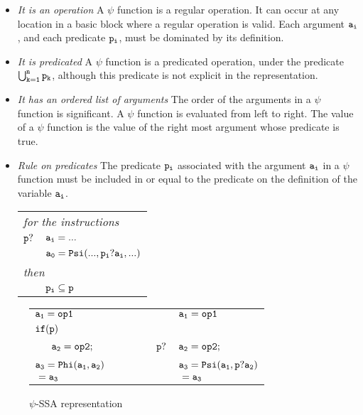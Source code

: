 \begin{itemize}

\item{\emph{It is an operation}} A $\psi$ function is a regular operation. It
  can occur at any location in a basic block where a regular operation
  is valid. Each argument ${\tt a_i}$, and each predicate ${\tt p_i}$,
  must be dominated by its definition.

\item{\emph{It is predicated}} A $\psi$ function is a predicated
  operation, under the predicate ${\tt \bigcup_{k=1}^n p_k}$,
  although this predicate is not explicit in the representation.

\item{\emph{It has an ordered list of arguments}} The order of the
  arguments in a $\psi$ function is significant. A $\psi$ function is
  evaluated from left to right. The value of a $\psi$ function is the
  value of the right most argument whose predicate is true.

\item{\emph{Rule on predicates}} The predicate ${\tt p_i}$ associated
  with the argument ${\tt a_i}$ in a $\psi$ function must be included
  in or equal to the predicate on the definition of the variable ${\tt
    a_i}$.

\begin{tabular}{ll}
\multicolumn{2}{l}{\it for the instructions}\\
${\tt p?}$ & ${\tt a_i = ...}$\\
& ${\tt a_0 = Psi(..., p_i?a_i, ...)}$\\
\multicolumn{2}{l}{\it then}\\
& ${\tt p_i} \subseteq {\tt p}$\\
\end{tabular}

\end{itemize}

\begin{figure}
\begin{center}
\footnotesize
\begin{tabular}{llll}
${\tt a_1 = op1}$ & & & ${\tt a_1 = op1}$ \\
${\tt if (p)}$        & & & \\
${\tt\ \ \ \ \ a_2 = op2;}$ & \ \ \ \ \  & ${\tt p?}$ & ${\tt a_2 = op2;}$ \\
${\tt a_3 = Phi(a_1, a_2)}$ & & & ${\tt a_3 = Psi(a_1, p?a_2)}$ \\
${\tt \ = a_3}$ & & & ${\tt \ = a_3}$ \\
\end{tabular}
\caption{$\psi$-SSA representation}
\label{fig:op_pred}
\end{center}
\end{figure}


